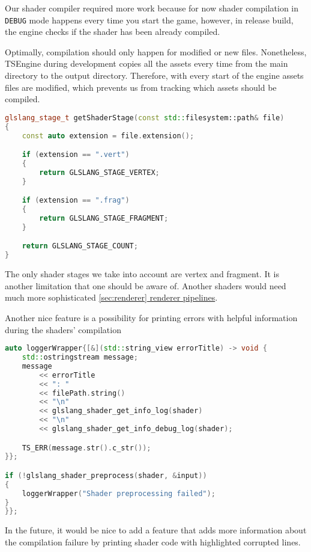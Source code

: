 Our shader compiler required more work because for now shader compilation in \texttt{DEBUG} mode happens every time you start the game, however, in release build, the engine checks if the shader has been already compiled.

Optimally, compilation should only happen for modified or new files. Nonetheless, TSEngine during development copies all the assets every time from the main directory to the output directory. Therefore, with every start of the engine assets files are modified, which prevents us from tracking which assets should be compiled.

\begin{lstlisting}[language=c++, caption=Shader Compiler supported shader stages (./engine/src/vulkan\_tools/shaders\_compiler.cpp)]
glslang_stage_t getShaderStage(const std::filesystem::path& file)
{
    const auto extension = file.extension();

    if (extension == ".vert")
    {
        return GLSLANG_STAGE_VERTEX;
    }

    if (extension == ".frag")
    {
        return GLSLANG_STAGE_FRAGMENT;
    }

    return GLSLANG_STAGE_COUNT;
}
\end{lstlisting}

The only shader stages we take into account are vertex and fragment. It is another limitation that one should be aware of. Another shaders would need much more sophisticated \hyperref[sec:renderer]{\ref*{sec:renderer} renderer pipelines}.

Another nice feature is a possibility for printing errors with helpful information during the shaders' compilation
\begin{lstlisting}[language=c++, caption=Shader Compiler logging (./engine/src/vulkan\_tools/shaders\_compiler.cpp)]
auto loggerWrapper{[&](std::string_view errorTitle) -> void {
    std::ostringstream message;
    message
        << errorTitle
        << ": "
        << filePath.string()
        << "\n"
        << glslang_shader_get_info_log(shader)
        << "\n"
        << glslang_shader_get_info_debug_log(shader);

    TS_ERR(message.str().c_str());
}};

if (!glslang_shader_preprocess(shader, &input))
{
    loggerWrapper("Shader preprocessing failed");
}
}};
\end{lstlisting}

In the future, it would be nice to add a feature that adds more information about the compilation failure by printing shader code with highlighted corrupted lines. 

